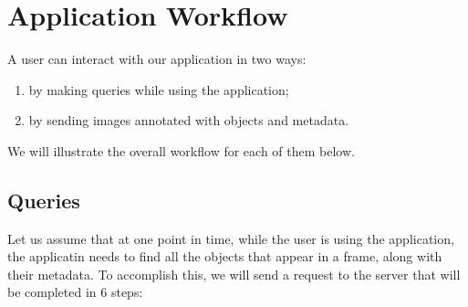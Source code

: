 \documentclass[a4paper,onecolumn,oneside,titlepage,11pt]{article}
\begin{document}
\clearpage
\section{Application Workflow}
A user can interact with our application in two ways:
\begin{enumerate}
	\item by making queries while using the application;
	\item by sending images annotated with objects and metadata.
\end{enumerate}
We will illustrate the overall workflow for each of them below.

\subsection{Queries}
Let us assume that at one point in time, while the user is using the application, the applicatin needs to find all the objects that appear in a frame, along with their metadata. To accomplish this, we will send a request to the server that will be completed in 6 steps:
\end{document}
